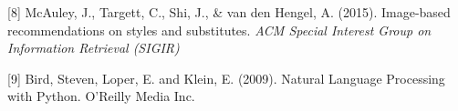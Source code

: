 \documentclass{article} %
\begin{document}
{%


[8] McAuley, J., Targett, C., Shi, J., \& van den Hengel, A. (2015). Image-based recommendations on styles and substitutes. {\it ACM Special Interest Group on Information Retrieval (SIGIR)}

[9] Bird, Steven, Loper, E. and Klein, E. (2009). Natural Language Processing with Python. O’Reilly Media Inc.





%
%



}
\end{document}
